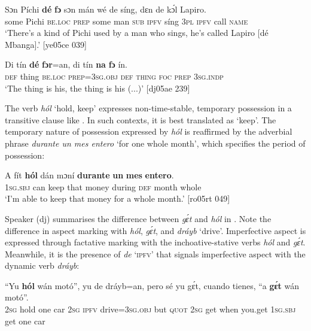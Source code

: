 \ea%
    \label{ex:key:821}
    \gll Sɔn    Píchi  \textbf{dé}    \textbf{fɔ}  sɔn    mán    wé  de  síng, 
dɛn  de  kɔ́l  Lapiro.\\
some  Pichi  \textsc{be.loc}  \textsc{prep}  some  man    \textsc{sub}  \textsc{ipfv}  síng
\textsc{3pl}  \textsc{ipfv}  call  \textsc{name}\\

\glt ‘There’s a kind of Pichi used by a man who sings, he’s called 
Lapiro [dé Mbanga].’ [ye05ce 039]
\z


\ea%
    \label{ex:key:822}
    \gll Di  tín    \textbf{dé}    \textbf{fɔr}=an,    di  tín    \textbf{na}  \textbf{fɔ} ín.\\
\textsc{def}  thing  \textsc{be.loc}  \textsc{prep}=\textsc{3sg.obj}  \textsc{def}  \textsc{thing}  \textsc{foc}  \textsc{prep}  \textsc{3sg.indp}\\

\glt ‘The thing is his, the thing is his (...)’ [dj05ae 239]
\z

The verb \textit{hól} ‘hold, keep’ expresses non-time-stable, temporary possession in a transitive clause like . In such contexts, it is best translated as ‘keep’. The temporary nature of possession expressed by \textit{hól} is reaffirmed by the adverbial phrase \textit{durante un mes entero} ‘for one whole month’, which specifies the period of possession: 


\ea%
    \label{ex:key:823}
    \gll \MakeUppercase{A}   fít  \textbf{hól}    dán    mɔní  \textbf{durante}  \textbf{un}  \textbf{mes}    \textbf{entero}.\\
\textsc{1sg.sbj}  can  keep  that    money  during  \textsc{def}  month  whole\\

\glt ‘I’m able to keep that money for a whole month.’ [ro05rt 049]
\z

Speaker (dj) summarises the difference between \textit{gɛ́t} and \textit{hól} in . Note the difference in aspect marking with \textit{hól}, \textit{gɛ́t}, and \textit{dráyb} ‘drive’. Imperfective{\fff} aspect is expressed through factative{\fff} marking with the inchoative-stative verbs \textit{hól} and \textit{gɛ́t}. Meanwhile, it is the presence of \textit{de} ‘\textsc{ipfv}’ that signals imperfective aspect with the dynamic verb \textit{dráyb}:


\ea%
    \label{ex:key:824}
    \gll “Yu  \textbf{hól}  wán  motó”,  yu  de  dráyb=an,  pero  sé    yu  gɛ́t,
cuando  tienes,    “a    \textbf{gɛ́t}  wán    motó”.\\
\phantom{“}\textsc{2sg}  hold  one  car    \textsc{2sg}  \textsc{ipfv}  drive=\textsc{3sg.obj}  but    \textsc{quot}    \textsc{2sg}  get
when  you.get    \phantom{“}\textsc{1sg.sbj}  get  one    car\\

